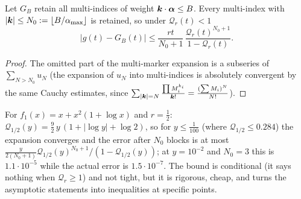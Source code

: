 \begin{corollary}
\label{cor:cutoff-bound}
Let $G_B$ retain all multi-indices of weight $\boldsymbol k\cdot\boldsymbol\alpha\le B$. Every multi-index with $|\boldsymbol k|\le N_0:=\lfloor B/\alpha_{\max}\rfloor$ is retained, so under $\mathcal Q_r(t)<1$
\[
 |g(t)-G_B(t)|\le\frac{rt}{N_0+1}\,\frac{\mathcal Q_r(t)^{N_0+1}}{1-\mathcal Q_r(t)} .
\]
\end{corollary}
\begin{proof}
The omitted part of the multi-marker expansion is a subseries of $\sum_{N>N_0}u_N$ (the expansion of $u_N$ into multi-indices is absolutely convergent by the same Cauchy estimates, since $\sum_{|\boldsymbol k|=N}\frac{\prod M_i^{k_i}}{\boldsymbol k!}=\frac{(\sum M_i)^N}{N!}$).
\end{proof}

\begin{example}
For $f_1(x)=x+x^2(1+\log x)$ and $r=\frac12$: $\mathcal Q_{1/2}(y)=\frac92\,y\,(1+|\log y|+\log2)$, so for $y\le\frac1{100}$ (where $\mathcal Q_{1/2}\le0.284$) the expansion converges and the error after $N_0$ blocks is at most $\frac{y}{2(N_0+1)}\mathcal Q_{1/2}(y)^{N_0+1}/(1-\mathcal Q_{1/2}(y))$; at $y=10^{-2}$ and $N_0=3$ this is $1.1\cdot10^{-5}$ while the actual error is $1.5\cdot10^{-7}$. The bound is conditional (it says nothing when $\mathcal Q_r\ge1$) and not tight, but it is rigorous, cheap, and turns the asymptotic statements into inequalities at specific points.
\end{example}
